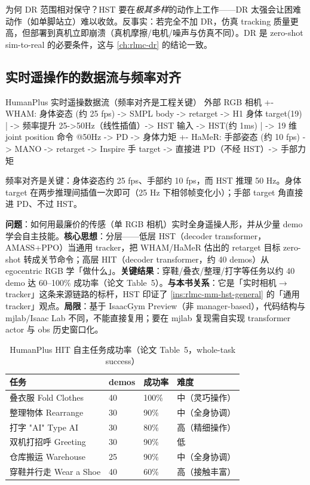 为何 DR 范围相对保守？HST 要在\emph{极其多样}的动作上工作——DR 太强会让困难动作（如单脚站立）难以收敛。反事实：若完全不加 DR，仿真 tracking 质量更高，但部署到真机立即崩溃（真机摩擦/电机/噪声与仿真不同）。DR 是 zero-shot sim-to-real 的必要条件，这与 \cref{ch:rlmc-dr} 的结论一致。

\subsection{实时遥操作的数据流与频率对齐}
\label{sec:rlmc-mm-humanplus-flow}

\begin{codebox}{HumanPlus 实时遥操数据流（频率对齐是工程关键）}
外部 RGB 相机
  +- WHAM:  身体姿态 (约 25 fps) -> SMPL body -> retarget -> H1 身体 target(19)
  |         -> 频率提升 25->50Hz（线性插值）-> HST 输入 -> HST(约 1ms)
  |         -> 19 维 joint position 命令 @50Hz -> PD -> 身体力矩
  +- HaMeR: 手部姿态 (约 10 fps) -> MANO -> retarget -> Inspire 手 target
            -> 直接进 PD（不经 HST）-> 手部力矩
\end{codebox}

频率对齐是关键：身体姿态约 25 fps、手部约 10 fps，而 HST 推理 50 Hz。身体 target 在两步推理间插值一次即可（25 Hz 下相邻帧变化小）；手部 target 角直接进 PD、不过 HST。

\begin{paper}\label{paper:rlmc-mm-humanplus}
\textbf{问题}：如何用最廉价的传感（单 RGB 相机）实时全身遥操人形，并从少量 demo 学会自主技能。\textbf{核心思想}：分层——低层 HST（decoder transformer，AMASS+PPO）当通用 tracker，把 WHAM/HaMeR 估出的 retarget 目标 zero-shot 转成关节命令；高层 HIT（decoder transformer，约 40 demos）从 egocentric RGB 学「做什么」。\textbf{关键结果}：穿鞋/叠衣/整理/打字等任务以约 40 demo 达 60--100\% 成功率（论文 Table~5）。\textbf{与本书关系}：它是「实时相机$\to$tracker」这条来源链路的标杆，HST 印证了 \cref{ins:rlmc-mm-hst-general} 的「通用 tracker」观点。\textbf{局限}：基于 IsaacGym Preview（非 manager-based），代码结构与 mjlab/Isaac Lab 不同，不能直接复用；要在 mjlab 复现需自实现 transformer actor 与 obs 历史窗口化。
\end{paper}

\begin{table}[ht]
\centering
\small
\caption{HumanPlus HIT 自主任务成功率（论文 Table~5，whole-task success）}
\label{tab:rlmc-mm-humanplus-succ}
\begin{tabular}{@{}llll@{}}
\toprule
任务 & demos & 成功率 & 难度 \\
\midrule
叠衣服 Fold Clothes & 40 & 100\% & 中（灵巧操作） \\
整理物体 Rearrange & 30 & 90\% & 中（全身协调） \\
打字 "AI" Type AI & 30 & 80\% & 高（精细操作） \\
双机打招呼 Greeting & 30 & 90\% & 低 \\
仓库搬运 Warehouse & 25 & 90\% & 中（全身协调） \\
穿鞋并行走 Wear a Shoe & 40 & 60\% & 高（接触丰富） \\
\bottomrule
\end{tabular}
\end{table}

